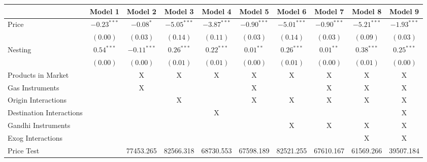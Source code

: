 
\begin{tabular}{l c c c c c c c c c}
\toprule
 & Model 1 & Model 2 & Model 3 & Model 4 & Model 5 & Model 6 & Model 7 & Model 8 & Model 9 \\
\midrule
Price                       & $-0.23^{***}$ & $-0.08^{*}$   & $-5.05^{***}$ & $-3.87^{***}$ & $-0.90^{***}$ & $-5.01^{***}$ & $-0.90^{***}$ & $-5.21^{***}$ & $-1.93^{***}$ \\
                            & $(0.00)$      & $(0.03)$      & $(0.14)$      & $(0.11)$      & $(0.03)$      & $(0.14)$      & $(0.03)$      & $(0.09)$      & $(0.03)$      \\
Nesting                     & $0.54^{***}$  & $-0.11^{***}$ & $0.26^{***}$  & $0.22^{***}$  & $0.01^{**}$   & $0.26^{***}$  & $0.01^{**}$   & $0.38^{***}$  & $0.25^{***}$  \\
                            & $(0.00)$      & $(0.00)$      & $(0.01)$      & $(0.01)$      & $(0.00)$      & $(0.01)$      & $(0.00)$      & $(0.01)$      & $(0.00)$      \\
\midrule
Products in Market          &               & X             & X             & X             & X             & X             & X             & X             & X             \\
Gas Instruments             &               & X             &               &               & X             &               & X             & X             & X             \\
Origin Interactions         &               &               & X             &               & X             & X             & X             & X             & X             \\
Destination Interactions    &               &               &               & X             &               &               &               &               & X             \\
Gandhi Instruments          &               &               &               &               &               & X             & X             & X             & X             \\
Exog Interactions           &               &               &               &               &               &               &               & X             & X             \\
Price Test                  &               & 77453.265     & 82566.318     & 68730.553     & 67598.189     & 82521.255     & 67610.167     & 61569.266     & 39507.184     \\

\end{tabular}
